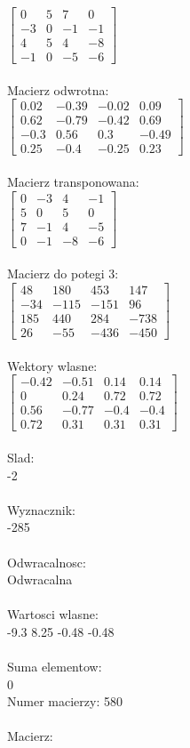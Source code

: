 \documentclass[a4paper,12pt]{article}
\begin{document}
$\begin{bmatrix} 0&5&7&0\\-3&0&-1&-1\\4&5&4&-8\\-1&0&-5&-6 \end{bmatrix}$
\\
\\
Macierz odwrotna:\\

$\begin{bmatrix} 0.02&-0.39&-0.02&0.09\\0.62&-0.79&-0.42&0.69\\-0.3&0.56&0.3&-0.49\\0.25&-0.4&-0.25&0.23 \end{bmatrix}$
\\
\\
Macierz transponowana:\\

$\begin{bmatrix} 0&-3&4&-1\\5&0&5&0\\7&-1&4&-5\\0&-1&-8&-6 \end{bmatrix}$
\\
\\
Macierz do potegi 3:\\

$\begin{bmatrix} 48&180&453&147\\-34&-115&-151&96\\185&440&284&-738\\26&-55&-436&-450 \end{bmatrix}$
\\
\\
Wektory wlasne:\\

$\begin{bmatrix} -0.42&-0.51&0.14&0.14\\0&0.24&0.72&0.72\\0.56&-0.77&-0.4&-0.4\\0.72&0.31&0.31&0.31 \end{bmatrix}$
\\
\\
Slad:\\
-2
\\
\\
Wyznacznik:\\
-285
\\
\\
Odwracalnosc:\\
Odwracalna
\\
\\
Wartosci wlasne:\\
-9.3 8.25 -0.48 -0.48
\\
\\
Suma elementow:\\
0
\\
\newpage
Numer macierzy:
580
\\
\\
Macierz:\\
\end{document}
